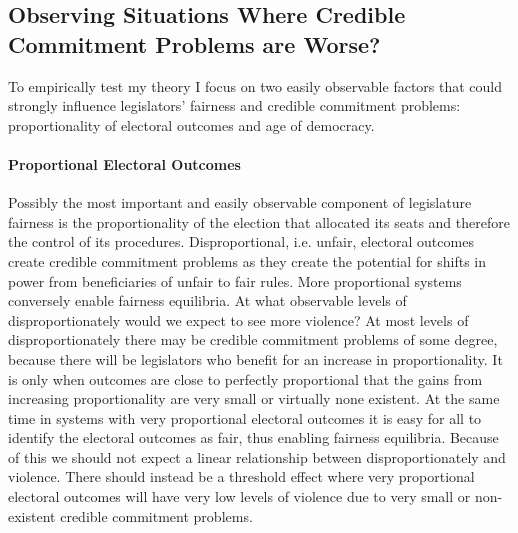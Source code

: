 \documentclass[a4paper]{article}\usepackage[]{graphicx}\usepackage[]{color}
\begin{document}
\subsection{Observing Situations Where Credible Commitment Problems are Worse?}

To empirically test my theory I focus on two easily observable factors that could strongly influence legislators' fairness and credible commitment problems: proportionality of electoral outcomes and age of democracy.

\paragraph{Proportional Electoral Outcomes}

Possibly the most important and easily observable component of legislature fairness is the proportionality of the election that allocated its seats and therefore the control of its procedures. Disproportional, i.e. unfair, electoral outcomes create credible commitment problems as they create the potential for shifts in power from beneficiaries of unfair to fair rules. More proportional systems conversely enable fairness equilibria. At what observable levels of disproportionately would we expect to see more violence? At most levels of disproportionately there may be credible commitment problems of some degree, because there will be legislators who benefit for an increase in proportionality. It is only when outcomes are close to perfectly proportional that the gains from increasing proportionality are very small or virtually none existent. At the same time in systems with very proportional electoral outcomes it is easy for all to identify the electoral outcomes as fair, thus enabling fairness equilibria. Because of this we should not expect a linear relationship between disproportionately and violence. There should instead be a threshold effect where very proportional electoral outcomes will have very low levels of violence due to very small or non-existent credible commitment problems. 
\end{document}
